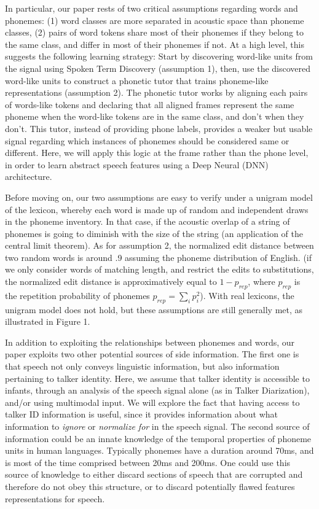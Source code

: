 \documentclass[a4paper]{article}
\begin{document}
In particular, our paper rests of two critical assumptions regarding words and phonemes: (1) word classes are more separated in acoustic space than phoneme classes, (2) pairs of word tokens share most of their phonemes if they belong to the same class, and differ in most of their phonemes if not. At a high level, this suggests the following learning strategy: Start by discovering word-like units from the signal using Spoken Term Discovery  (assumption 1), then, use the discovered word-like units to construct a phonetic tutor that trains phoneme-like representations (assumption 2). The phonetic tutor works by aligning each pairs of words-like tokens and declaring that all aligned frames represent the same phoneme when the word-like tokens are in the same class, and don't when they don't. This tutor, instead of providing phone labels, provides a weaker but usable signal regarding which instances of phonemes should be considered same or different. Here, we will apply this logic at the frame rather than the phone level, in order to learn abstract speech features using a Deep Neural (DNN) architecture.


Before moving on, our two assumptions are easy to verify under a unigram model of the lexicon, whereby each word is made up of random and independent draws in the phoneme inventory. In that case, if the acoustic overlap of a string of phonemes is going to diminish with the size of the string (an application of the central limit theorem). As for assumption 2, the normalized edit distance between two random words is around .9 assuming the phoneme distribution of English. (if we only consider words of matching length, and restrict the edits to substitutions, the normalized edit distance is approximatively equal to $1-p_{rep}$, where $p_{rep}$ is the repetition probability of phonemes $p_{rep}=\sum_i{p_i^2}$). With real lexicons, the unigram model does not hold, but these assumptions are still generally met, as illustrated in Figure 1.

In addition to exploiting the relationships between phonemes and words, our paper exploits two other potential sources of side information. The first one is that speech not only conveys linguistic information, but also information pertaining to talker identity. Here, we assume that talker identity is accessible to infants, through an analysis of the speech signal alone (as in Talker Diarization), and/or using multimodal input. We will explore the fact that having access to talker ID information is useful, since it provides information about what information to \emph{ignore} or \emph{normalize for} in the speech signal. The second source of information could be an innate knowledge of the temporal properties of phoneme units in human languages. Typically phonemes have a duration around 70ms, and is most of the time comprised between 20ms and 200ms. One could use this source of knowledge to either discard sections of speech that are corrupted and therefore do not obey this structure, or to discard potentially flawed features representations for speech.
\end{document}
